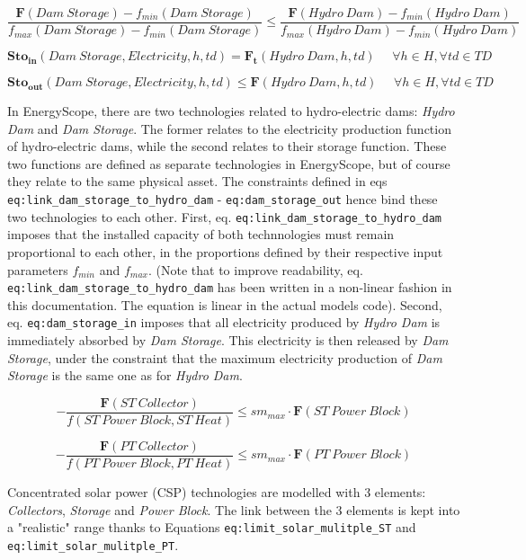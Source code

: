 \documentclass[
]{article}
\begin{document}
{\[\frac{\textbf{F}(Dam~Storage) - f_{min}(Dam~Storage)}{f_{max}(Dam~Storage) - f_{min}(Dam~Storage)} \leq \frac{\textbf{F}(Hydro~Dam) - f_{min}(Hydro~Dam)}{f_{max}(Hydro~Dam) - f_{min}(Hydro~Dam)}\]}

{\[\textbf{Sto}_\textbf{in}(Dam~Storage,Electricity,h,td) = \textbf{F}_{\textbf{t}}(Hydro~Dam,h,td) ~~~~~~ \forall h \in H, \forall td \in TD\]}

{\[\textbf{Sto}_\textbf{out}(Dam~Storage,Electricity,h,td) \leq \textbf{F}(Hydro~Dam,h,td) ~~~~~~ \forall h \in H, \forall td \in TD\]}

In EnergyScope, there are two technologies related to hydro-electric
dams: \emph{Hydro Dam} and \emph{Dam Storage}. The former relates to the
electricity production function of hydro-electric dams, while the second
relates to their storage function. These two functions are defined as
separate technologies in EnergyScope, but of course they relate to the
same physical asset. The constraints defined in eqs
\texttt{eq:link\_dam\_storage\_to\_hydro\_dam} -
\texttt{eq:dam\_storage\_out} hence bind these two technologies to each
other. First, eq. \texttt{eq:link\_dam\_storage\_to\_hydro\_dam} imposes
that the installed capacity of both technnologies must remain
proportional to each other, in the proportions defined by their
respective input parameters \(f_{min}\) and \(f_{max}\). (Note that to
improve readability, eq. \texttt{eq:link\_dam\_storage\_to\_hydro\_dam}
has been written in a non-linear fashion in this documentation. The
equation is linear in the actual model\textquotesingle s code). Second,
eq. \texttt{eq:dam\_storage\_in} imposes that all electricity produced
by \emph{Hydro Dam} is immediately absorbed by \emph{Dam Storage}. This
electricity is then released by \emph{Dam Storage}, under the constraint
that the maximum electricity production of \emph{Dam Storage} is the
same one as for \emph{Hydro Dam}.

{\[-\frac{\textbf{F}(ST~Collector)}{f(ST~Power~Block, ST~Heat)} \leq sm_{max} \cdot \textbf{F}(ST~Power~Block)\]}

{\[-\frac{\textbf{F}(PT~Collector)}{f(PT~Power~Block, PT~Heat)} \leq sm_{max} \cdot \textbf{F}(PT~Power~Block)\]}

Concentrated solar power (CSP) technologies are modelled with 3
elements: \emph{Collectors}, \emph{Storage} and \emph{Power Block}. The
link between the 3 elements is kept into a "realistic" range thanks to
Equations \texttt{eq:limit\_solar\_mulitple\_ST} and
\texttt{eq:limit\_solar\_mulitple\_PT}.
\end{document}
